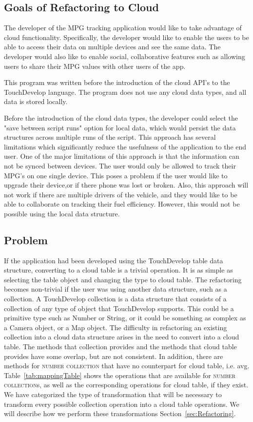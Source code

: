 \documentclass{sigplanconf}
\begin{document}
\subsection{Goals of Refactoring to Cloud}
The developer of the MPG tracking application would like to take advantage of cloud functionality.  Specifically, the developer would like to enable the users to be able to access their data on multiple devices and see the same data. The developer would also like to enable social, collaborative features such as allowing users to share their MPG values with other users of the app.

This program was written before the introduction of the cloud API's to the TouchDevelop language.  The program does not use any cloud data types, and all data is stored locally.

Before the introduction of the cloud data types, the developer could select the "save between script runs" option for local data, which would persist the data structures across multiple runs of the script.  This approach has several limitations which significantly reduce the usefulness of the application to the end user.  One of the major limitations of this approach is that the information can not be synced between devices.  The user would only be allowed to track their MPG's on one single device.  This poses a problem if the user would like to upgrade their device,or if there phone was lost or broken.   Also, this approach will not work if there are multiple drivers of the vehicle, and they would like to be able to collaborate on tracking their fuel efficiency.  However, this would not be possible using the local data structure.


  
\subsection{Problem}
If the application had been developed using the TouchDevelop table data structure, converting to a cloud table is a trivial operation.  It is as simple as selecting the table object and changing the type to cloud table.  The refactoring becomes non-trivial if the user was using another data structure, such as a collection. A TouchDevelop collection is a data structure that consists of a collection of any type of object that TouchDevelop supports.  This could be a primitive type such as Number or String, or it could be something as complex as a Camera object, or a Map object.  The difficulty in refactoring an existing collection into a cloud data structure arises in the need to convert into a cloud table.  The methods that collection provides and the methods that cloud table provides have some overlap, but are not consistent.  In addition, there are methods for \textsc{number collection} that have no counterpart for cloud table, i.e. avg.  Table~\ref{tab:mappingTable} shows the operations that are available for \textsc{number collection}s, as well as the corresponding operations for cloud table, if they exist.  We have categorized the type of transformation that will be necessary to transform every possible collection operation into a cloud table operations.  We will describe how we perform these transformations Section~\ref{sec:Refactoring}.
\end{document}
